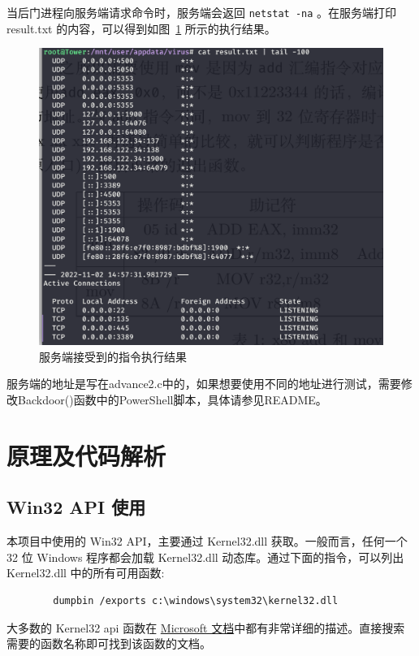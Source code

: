 \documentclass[UTF8]{ctexart}
\begin{document}
    当后门进程向服务端请求命令时，服务端会返回 \lstinline{netstat -na} 。在服务端打印 result.txt 的内容，可以得到如图~\ref{fig:backdoor-test-server} 所示的执行结果。
    
    \begin{figure}[h]
        \centering
        \includegraphics[width=12cm]{.asset/backdoor-test-server.png}
        \caption{服务端接受到的指令执行结果}
        \label{fig:backdoor-test-server}
    \end{figure}
    
    服务端的地址是写在advance2.c中的，如果想要使用不同的地址进行测试，需要修改Backdoor()函数中的PowerShell脚本，具体请参见README。
    
    \section{原理及代码解析}

    \subsection{Win32 API 使用}

    本项目中使用的 Win32 API，主要通过 Kernel32.dll 获取。一般而言，任何一个 32 位 Windows 程序都会加载 Kernel32.dll 动态库。通过下面的指令，可以列出 Kernel32.dll 中的所有可用函数:

    \begin{lstlisting}
        dumpbin /exports c:\windows\system32\kernel32.dll
    \end{lstlisting}

    大多数的 Kernel32 api 函数在 \href{https://learn.microsoft.com/en-us/docs/}{Microsoft 文档}中都有非常详细的描述。直接搜索需要的函数名称即可找到该函数的文档。
\end{document}
